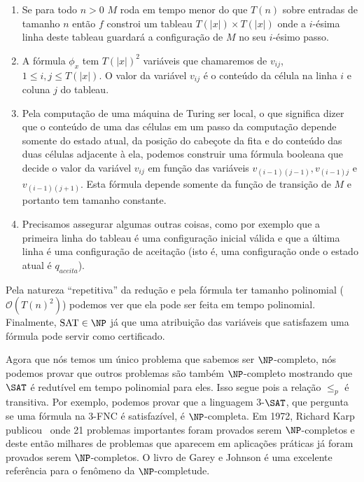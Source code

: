 \begin{enumerate}

\item Se para todo $n > 0$ $M$ roda em tempo menor do que $T(n)$ sobre entradas de tamanho $n$ então $f$ constroi um tableau $T(\lvert x \rvert) \times T(\lvert x \rvert)$ onde a $i$-ésima linha deste tableau guardará a configuração de $M$ no seu $i$-ésimo passo.

\item A fórmula $\phi_{x}$ tem $T(\lvert x \rvert)^{2}$ variáveis que chamaremos de $v_{ij}$, $1 \leq i, j \leq T(\lvert x \rvert)$. O valor da variável $v_{ij}$ é o conteúdo da célula na linha $i$ e coluna $j$ do tableau. 

\item Pela computação de uma máquina de Turing ser local, o que significa dizer que o conteúdo de uma das células em um passo da computação depende somente do estado atual, da posição do cabeçote da fita e do conteúdo das duas células adjacente à ela, podemos construir uma fórmula booleana que decide o valor da variável $v_{ij}$ em função das variáveis $v_{(i - 1)(j - 1)}, v_{(i - 1)j}$ e $v_{(i - 1)(j + 1)}$. Esta fórmula depende somente da função de transição de $M$ e portanto tem tamanho constante.

\item Precisamos assegurar algumas outras coisas, como por exemplo que a primeira linha do tableau é uma configuração inicial válida e que a última linha é uma configuração de aceitação (isto é, uma configuração onde o estado atual é $q_{aceita}$).

\end{enumerate}

Pela natureza ``repetitiva'' da redução e pela fórmula ter tamanho polinomial ($\mathcal{O}(T(n)^{2})$) podemos ver que ela pode ser feita em tempo polinomial. Finalmente, $\text{SAT} \in \NP$ já que uma atribuição das variáveis que satisfazem uma fórmula pode servir como certificado.

Agora que nós temos um único problema que sabemos ser $\NP$-completo, nós podemos provar que outros problemas são também $\NP$-completo mostrando que $\SAT$ é redutível em tempo polinomial para eles. Isso segue pois a relação $\leq_{p}$ é transitiva. Por exemplo, podemos provar que a linguagem 3-$\SAT$, que pergunta se uma fórmula na 3-FNC é satisfazível, é $\NP$-completa. Em 1972, Richard Karp publicou~\cite{karp1972reducibility} onde 21 problemas importantes foram provados serem $\NP$-completos e deste então milhares de problemas que aparecem em aplicações práticas já foram provados serem $\NP$-completos. O livro de Garey e Johnson é uma excelente referência para o fenômeno da $\NP$-completude.~\cite{garey2002computers}

